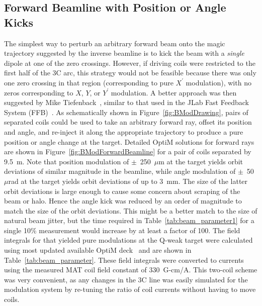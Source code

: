 \subsection{Forward Beamline with Position or Angle Kicks}
\label{Forward Beamline with Position or Angle Kicks}
The simplest way to perturb an arbitrary forward beam onto the magic trajectory suggested by the inverse beamline is to kick the beam with a \textit{single} dipole at one of the zero crossings.  However, if driving coils were restricted to the first half of the 3C arc, this strategy would not be feasible because there was only one zero crossing in that region (corresponding to pure $X^\prime$ modulation), with no zeros corresponding to $X$, $Y$, or $Y^\prime$ modulation.  A better approach was then suggested by Mike Tiefenback~\cite{tiefenback_communication}, similar to that used in the JLab Fast Feedback System (FFB)~\cite{jlab_ffb1,jlab_ffb2}. As schematically shown in Figure~\ref{fig:BModDrawing}, pairs of separated coils could be used to take an arbitrary forward ray, offset its position and angle, and re-inject it along the appropriate trajectory to produce a pure position or angle change at the target. Detailed OptiM solutions for forward rays are shown in Figure~\ref{fig:BModForwardBeamline} for a pair of coils separated by 9.5~m. Note that position modulation of $\pm$~250~$\mu$m at the target yields orbit deviations of similar magnitude in the beamline, while angle modulation of $\pm$~50~$\mu$rad at the target yields orbit deviations of up to 3~mm.  The size of the latter orbit deviations is large enough to cause some concern about scraping of the beam or halo. 
Hence the angle kick was reduced by an order of magnitude to match the size of the orbit deviations. This might be a better match to the size of natural beam jitter, but the time required in Table~\ref{tab:beam_parameter1} for a single 10\% measurement would increase by at least a factor of 100. The field integrals for that yielded pure modulations at the Q-weak target were calculated using most updated available OptiM deck~\cite{optim_deck} and are shown in Table~\ref{tab:beam_parameter}.
These field integrals were converted to currents using the measured MAT coil field constant of 330~G-cm/A. This two-coil scheme was very convenient, as any changes in the 3C line was easily simulated for the modulation system by re-tuning the ratio of coil currents without having to move coils.

